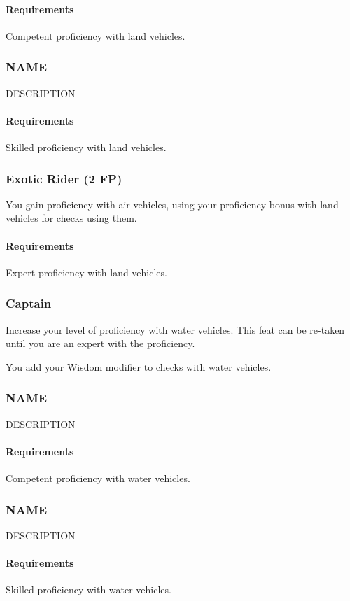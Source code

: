     \paragraph{Requirements} Competent proficiency with land vehicles.
\subsubsection{NAME} \label{feat::name}
    DESCRIPTION
    \paragraph{Requirements} Skilled proficiency with land vehicles.
\subsubsection{Exotic Rider (2 FP)} \label{feat::exoticrider}
    You gain proficiency with air vehicles, using your proficiency bonus with land vehicles for checks using them.
    \paragraph{Requirements} Expert proficiency with land vehicles.

\subsubsection{Captain} \label{feat::captain}
    Increase your level of proficiency with water vehicles.
    This feat can be re-taken until you are an expert with the proficiency.

    You add your Wisdom modifier to checks with water vehicles.
\subsubsection{NAME} \label{feat::name}
    DESCRIPTION
    \paragraph{Requirements} Competent proficiency with water vehicles.
\subsubsection{NAME} \label{feat::name}
    DESCRIPTION
    \paragraph{Requirements} Skilled proficiency with water vehicles.
